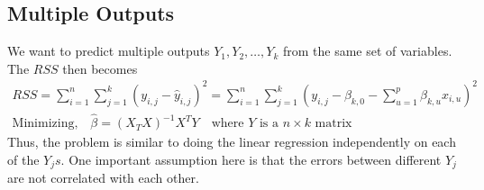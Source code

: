 \documentclass[../statistical_learning_notes.tex]{subfiles}
\begin{document}
\subsection{Multiple Outputs}
We want to predict multiple outputs $Y_{1}, Y_{2}, \ldots, Y_{k}$ from the same set of variables. The $RSS$ then becomes
\begin{gather*}
    RSS = \sum_{i=1}^{n} \sum_{j=1}^{k} (y_{i,j} - \hat{y}_{i,j})^{2} = \sum_{i=1}^{n} \sum_{j=1}^{k} (y_{i,j} - \beta_{k,0} - \sum_{u=1}^{p} \beta_{k,u}x_{i,u})^{2}\\
    \text{Minimizing,} \quad \hat{\beta} = (X_{T}X)^{-1}X^{T}Y \quad \text{where $Y$ is a $n \times k$ matrix}
\end{gather*}
Thus, the problem is similar to doing the linear regression independently on each of the $Y_{j}s$. One important assumption here is that the errors between different $Y_{j}$ are not correlated with each other.
\end{document}
